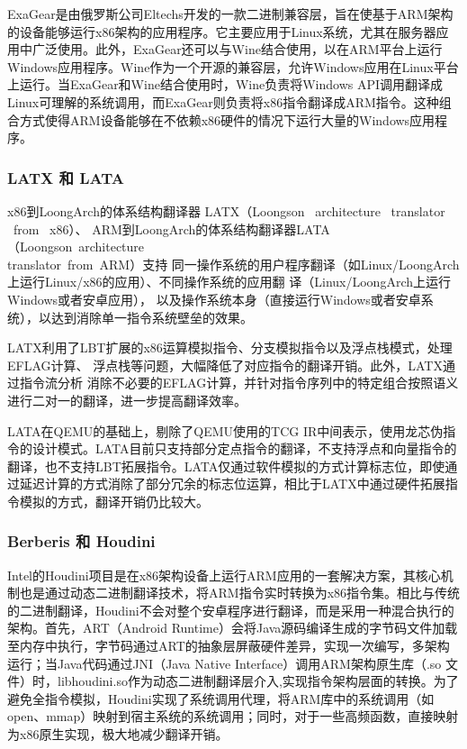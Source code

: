 ExaGear是由俄罗斯公司Eltechs开发的一款二进制兼容层，旨在使基于ARM架构的设备能够运行x86架构的应用程序。它主要应用于Linux系统，尤其在服务器应用中广泛使用。此外，ExaGear还可以与Wine结合使用，以在ARM平台上运行Windows应用程序。Wine作为一个开源的兼容层，允许Windows应用在Linux平台上运行。当ExaGear和Wine结合使用时，Wine负责将Windows API调用翻译成Linux可理解的系统调用，而ExaGear则负责将x86指令翻译成ARM指令。这种组合方式使得ARM设备能够在不依赖x86硬件的情况下运行大量的Windows应用程序。

\subsubsection{LATX 和 LATA}
x86到LoongArch的体系结构翻译器 LATX（Loongson  architecture  translator  from  x86）、 ARM到LoongArch的体系结构翻译器LATA（Loongson architecture  \\translator from ARM）支持 同一操作系统的用户程序翻译（如Linux/LoongArch 上运行Linux/x86的应用）、不同操作系统的应用翻 译（Linux/LoongArch上运行Windows或者安卓应用）， 以及操作系统本身（直接运行Windows或者安卓系统），以达到消除单一指令系统壁垒的效果。

LATX利用了LBT扩展的x86运算模拟指令、分支模拟指令以及浮点栈模式，处理EFLAG计算、 浮点栈等问题，大幅降低了对应指令的翻译开销。此外，LATX通过指令流分析 消除不必要的EFLAG计算，并针对指令序列中的特定组合按照语义进行二对一的翻译，进一步提高翻译效率。

LATA在QEMU的基础上，剔除了QEMU使用的TCG IR中间表示，使用龙芯伪指令的设计模式。LATA目前只支持部分定点指令的翻译，不支持浮点和向量指令的翻译，也不支持LBT拓展指令。LATA仅通过软件模拟的方式计算标志位，即使通过延迟计算的方式消除了部分冗余的标志位运算，相比于LATX中通过硬件拓展指令模拟的方式，翻译开销仍比较大。

\subsubsection{Berberis 和 Houdini}
Intel的Houdini项目是在x86架构设备上运行ARM应用的一套解决方案，其核心机制也是通过动态二进制翻译技术，将ARM指令实时转换为x86指令集。相比与传统的二进制翻译，Houdini不会对整个安卓程序进行翻译，而是采用一种混合执行的架构。首先，ART（Android Runtime）会将Java源码编译生成的字节码文件加载至内存中执行，字节码通过ART的抽象层屏蔽硬件差异，实现一次编写，多架构运行；当Java代码通过JNI（Java Native Interface）调用ARM架构原生库（.so 文件）时，libhoudini.so作为动态二进制翻译层介入,实现指令架构层面的转换。为了避免全指令模拟‌，‌Houdini实现了系统调用代理‌，将ARM库中的系统调用（如 open、mmap）映射到宿主系统的系统调用；同时，对于一些高频函数，直接映射为x86原生实现，极大地减少翻译开销‌。

